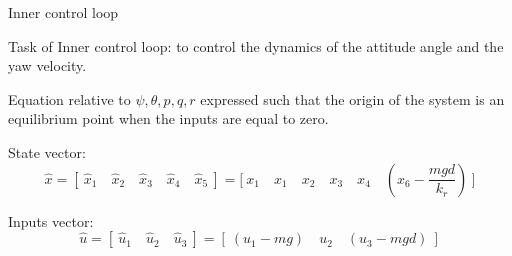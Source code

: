 \begin{frame}{Inner control loop}
	\begin{alertblock}{Task of Inner control loop: }
		\bigskip \hfill to control the dynamics of the attitude angle and the yaw velocity.
	\end{alertblock}
	\bigskip
	Equation relative to $ \psi, \theta, p, q, r $ expressed such that the origin of the system is an equilibrium point when the inputs are equal to zero.
	
	\begin{block}{State vector:}
		\begin{equation}
		\hat{x} = [ \ \hat{x}_1 \quad \hat{x}_2 \quad \hat{x}_3 \quad \hat{x}_4 \quad \hat{x}_5 \ ] = \Big[ \ x_1 \quad x_1 \quad x_2 \quad x_3 \quad x_4 \quad (x_6-\dfrac{mgd}{k_r}) \ \Big]	
		\end{equation}
	\end{block}

	\begin{block}{Inputs vector:}
		\begin{equation}
		\hat{u} = [ \ \hat{u}_1 \quad \hat{u}_2 \quad \hat{u}_3 \ ] = [ \ (u_1 -mg) \quad u_2 \quad (u_3 - mgd) \ ]
		\end{equation}
	\end{block}
\end{frame}


